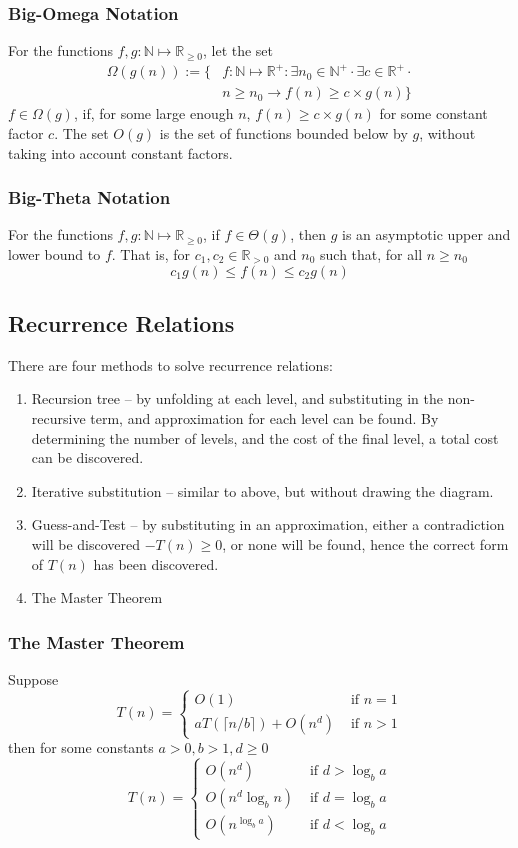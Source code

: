 \documentclass[10pt]{article}
\begin{document}
\subsubsection{Big-Omega Notation}
For the functions $f,g:\mathbb N\mapsto \mathbb R_{\ge0}$, let the set
\begin{align*}
	\Omega(g(n)) :=\{&f:\mathbb N\mapsto \mathbb R^+ : \exists n_0\in\mathbb N^+ \cdot \exists c \in \mathbb R^+ \cdot\\
			  & n \ge n_0 \rightarrow f(n) \ge c \times g(n)\}
\end{align*}
$f\in \Omega(g)$, if, for some large enough $n$, $f(n)\ge c\times g(n)$ for some constant factor $c$.  The set $O(g)$ is the set of functions bounded below by $g$, without taking into account constant factors.
\subsubsection{Big-Theta Notation}
For the functions $f,g:\mathbb N\mapsto \mathbb R_{\ge0}$, if $f\in \Theta(g)$, then $g$ is an asymptotic upper and lower bound to $f$.  That is, for $c_1,c_2\in\mathbb R_{>0}$ and $n_0$ such that, for all $n\ge n_0$ \[c_1g(n)\le f(n)\le c_2g(n)\]
\subsection{Recurrence Relations}
There are four methods to solve recurrence relations:
\begin{enumerate}
	\item Recursion tree -- by unfolding at each level, and substituting in the non-recursive term, and approximation for each level can be found.  By determining the number of levels, and the cost of the final level, a total cost can be discovered.
	\item Iterative substitution -- similar to above, but without drawing the diagram.
	\item Guess-and-Test -- by substituting in an approximation, either a contradiction will be discovered $-T(n)\ge 0$, or none will be found, hence the correct form of $T(n)$ has been discovered.
	\item The Master Theorem
\end{enumerate}
\subsubsection{The Master Theorem}
Suppose\[T(n)=\begin{cases} O(1)&\text{ if }n=1\\ aT(\lceil n/b\rceil)+O(n^d)&\text{ if }n>1\end{cases}\]then for some constants $a>0,b>1,d\ge 0$
	\[T(n)=\begin{cases} O(n^d)&\text{ if }d>\log_ba\\O(n^d\log_bn)&\text{ if }d=\log_ba\\O(n^{\log_ba})&\text{ if }d<\log_ba\end{cases}\]
\end{document}
